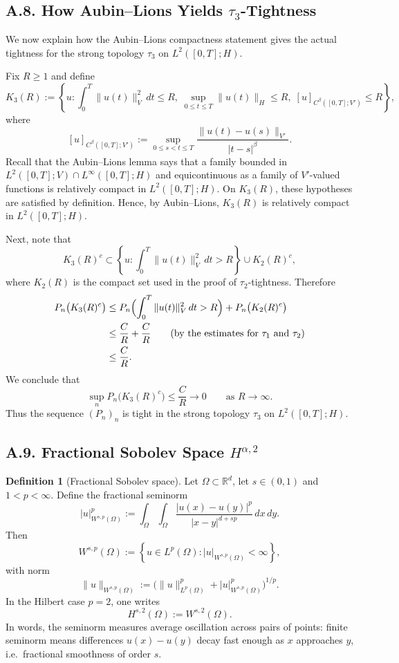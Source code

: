 \documentclass[11pt]{article}
\theoremstyle{definition}
\newtheorem{definition}{Definition}
\theoremstyle{remark}
\begin{document}
\subsection*{A.8. How Aubin--Lions Yields $\tau_3$-Tightness}
We now explain how the Aubin--Lions compactness statement gives the actual tightness for the strong topology $\tau_3$ on $L^2([0,T];H)$.

Fix $R\ge 1$ and define
\[
  K_3(R)
  :=
  \left\{
    u:
    \int_0^T \|u(t)\|_V^2\,dt\le R,\;
    \sup_{0\le t\le T}\|u(t)\|_H\le R,\;
    [u]_{C^\beta([0,T];V')}\le R
  \right\},
\]
where
\[
  [u]_{C^\beta([0,T];V')}
  :=
  \sup_{0\le s<t\le T}\frac{\|u(t)-u(s)\|_{V'}}{|t-s|^\beta}.
\]
Recall that the Aubin--Lions lemma says that a family bounded in $L^2([0,T];V)\cap L^\infty([0,T];H)$ and equicontinuous as a family of $V'$-valued functions is relatively compact in $L^2([0,T];H)$. On $K_3(R)$, these hypotheses are satisfied by definition. Hence, by Aubin--Lions, $K_3(R)$ is relatively compact in $L^2([0,T];H)$.

Next, note that
\[
  K_3(R)^c
  \subset
  \left\{
    u:
    \int_0^T \|u(t)\|_V^2\,dt>R
  \right\}
  \cup
  K_2(R)^c,
\]
where $K_2(R)$ is the compact set used in the proof of $\tau_2$-tightness. Therefore
\begin{align*}
  P_n\bigl(K_3(R)^c\bigr)
  &\le
  P_n\Bigl(
    \int_0^T \|u(t)\|_V^2\,dt>R
  \Bigr)
  +
  P_n\bigl(K_2(R)^c\bigr) \\
  &\le
  \frac{C}{R}
  +
  \frac{C}{R}
  \qquad \text{(by the estimates for $\tau_1$ and $\tau_2$)} \\
  &\le
  \frac{C}{R}.
\end{align*}
We conclude that
\[
  \sup_n
  P_n\bigl(K_3(R)^c\bigr)
  \le
  \frac{C}{R}\to 0
  \qquad \text{as } R\to\infty.
\]
Thus the sequence $(P_n)_n$ is tight in the strong topology $\tau_3$ on $L^2([0,T];H)$.

\subsection*{A.9. Fractional Sobolev Space $H^{\alpha,2}$}
\begin{definition}[Fractional Sobolev space]
Let $\Omega\subset\mathbb R^d$, let $s\in(0,1)$ and $1<p<\infty$. Define the fractional seminorm
\[
\lvert u\rvert_{W^{s,p}(\Omega)}^p
:=
\int_\Omega\int_\Omega
\frac{|u(x)-u(y)|^p}{|x-y|^{d+sp}}\,dx\,dy.
\]
Then
\[
W^{s,p}(\Omega)
:=
\left\{
u\in L^p(\Omega):
\lvert u\rvert_{W^{s,p}(\Omega)}<\infty
\right\},
\]
with norm
\[
\|u\|_{W^{s,p}(\Omega)}
:=
\bigl(\|u\|_{L^p(\Omega)}^p+\lvert u\rvert_{W^{s,p}(\Omega)}^p\bigr)^{1/p}.
\]
In the Hilbert case $p=2$, one writes
\[
H^{s,2}(\Omega):=W^{s,2}(\Omega).
\]
In words, the seminorm measures average oscillation across pairs of points: finite seminorm means differences $u(x)-u(y)$ decay fast enough as $x$ approaches $y$, i.e.\ fractional smoothness of order $s$.
\end{definition}
\end{document}
